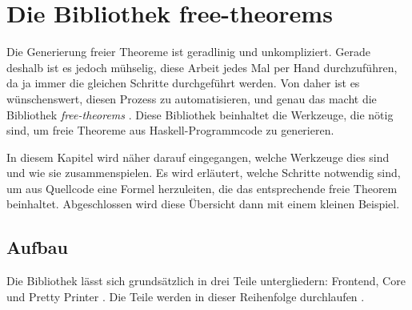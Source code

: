 \section{Die Bibliothek free-theorems}

Die Generierung freier Theoreme ist geradlinig und unkompliziert. Gerade deshalb ist es jedoch mühselig, diese Arbeit jedes
Mal per Hand durchzuführen, da ja immer die gleichen Schritte durchgeführt werden. Von daher ist es wünschenswert, diesen
Prozess zu automatisieren, und genau das macht die Bibliothek \textit{free-theorems} \cite{freetheorems}. Diese Bibliothek
beinhaltet die Werkzeuge, die nötig sind, um freie Theoreme aus Haskell-Programmcode zu generieren.

In diesem Kapitel wird näher darauf eingegangen, welche Werkzeuge dies sind und wie sie zusammenspielen. Es wird erläutert,
welche Schritte notwendig sind, um aus Quellcode eine Formel herzuleiten, die das entsprechende freie Theorem beinhaltet.
Abgeschlossen wird diese Übersicht dann mit einem kleinen Beispiel.




\subsection{Aufbau}

Die Bibliothek lässt sich grundsätzlich in drei Teile untergliedern: Frontend, Core und Pretty Printer \cite{freetheorems}. Die
Teile werden in dieser Reihenfolge durchlaufen .

